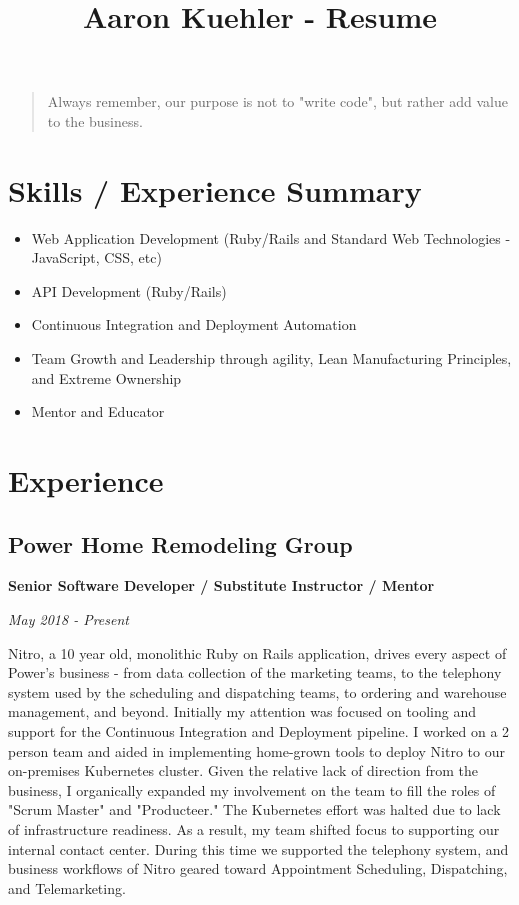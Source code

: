 \documentclass[12pt letterpaper notitlepage]{article}
\date{}
\title{Aaron Kuehler - Resume}
\begin{document}
\maketitle
\begin{quote}
Always remember, our purpose is not to "write code", but rather add value to the business.
\end{quote}

\section*{Skills / Experience Summary}
\label{sec:orgbd378e5}

\begin{itemize}
\item Web Application Development (Ruby/Rails and Standard Web Technologies - JavaScript, CSS, etc)
\item API Development (Ruby/Rails)
\item Continuous Integration and Deployment Automation
\item Team Growth and Leadership through agility, Lean Manufacturing Principles, and Extreme Ownership
\item Mentor and Educator
\end{itemize}

\section*{Experience}
\label{sec:org2b6546a}

\subsection*{Power Home Remodeling Group}
\label{sec:org3036cb0}

\textbf{Senior Software Developer / Substitute Instructor / Mentor}

\emph{May 2018 - Present}

Nitro, a 10 year old, monolithic Ruby on Rails application, drives every aspect of Power's business - from data collection of the marketing teams, to the telephony system used by the scheduling and dispatching teams, to ordering and warehouse management, and beyond. Initially my attention was focused on tooling and support for the Continuous Integration and Deployment pipeline. I worked on a 2 person team and aided in implementing home-grown tools to deploy Nitro to our on-premises Kubernetes cluster. Given the relative lack of direction from the business, I organically expanded my involvement on the team to fill the roles of "Scrum Master" and "Producteer." The Kubernetes effort was halted due to lack of infrastructure readiness. As a result, my team shifted focus to supporting our internal contact center. During this time we supported the telephony system, and business workflows of Nitro geared toward Appointment Scheduling, Dispatching, and Telemarketing.
\end{document}
